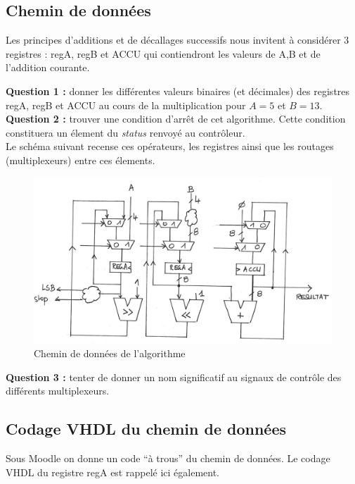 \documentclass[a4paper,11pt]{article}
\begin{document}
\subsection{Chemin de données}

Les principes d'additions et de décallages successifs nous invitent à considérer 3 registres : regA, regB et ACCU qui contiendront les valeurs de A,B et de l'addition courante.

{\bf Question 1 : }  donner les différentes valeurs binaires (et décimales) des registres regA, regB et ACCU au cours de la multiplication pour $A=5$ et $B=13$.\\

{\bf Question 2 : }  trouver une condition d'arrêt de cet algorithme. Cette condition constituera un élement du {\it status} renvoyé au contrôleur.\\

Le schéma suivant recense ces opérateurs, les registres ainsi que les routages (multiplexeurs) entre ces élements.

\begin{figure}[!h]
\begin{center}
\includegraphics[scale=0.3]{./figures/datapath.png}
\end{center}
\caption{Chemin de données de l'algorithme}
\end{figure}

{\bf Question 3 :} tenter de donner un nom significatif au signaux de contrôle des différents multiplexeurs.

\subsection{Codage VHDL du chemin de données}


Sous Moodle on donne un code ``à trous'' du chemin de données. Le codage VHDL du registre regA est rappelé ici également.\\
\end{document}
